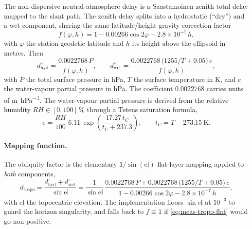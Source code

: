 The non-dispersive neutral-atmosphere delay is a Saastamoinen zenith total
delay \citep{saastamoinen1972} mapped to the slant path. The zenith delay
splits into a hydrostatic (``dry'') and a wet component, sharing the same
latitude/height gravity correction factor
\begin{equation}
  f(\varphi, h) = 1 - 0.00266\cos 2\varphi - 2.8\times 10^{-7}\,h ,
  \label{eq:meas-tropo-flat}
\end{equation}
with $\varphi$ the station geodetic latitude and $h$ its height above the
ellipsoid in metres. Then
\begin{equation}
  d^{z}_\mathrm{hyd} = \frac{0.0022768\,P}{f(\varphi,h)},
  \qquad
  d^{z}_\mathrm{wet}
    = \frac{0.0022768\,\big(1255/T + 0.05\big)\,e}{f(\varphi,h)},
  \label{eq:meas-tropo-zenith}
\end{equation}
with $P$ the total surface pressure in \si{\hecto\pascal}, $T$ the surface
temperature in \si{\kelvin}, and $e$ the water-vapour partial pressure in
\si{\hecto\pascal}. The coefficient $0.0022768$ carries units of
\si{\meter\per\hecto\pascal}. The water-vapour partial pressure is derived from
the relative humidity $RH \in [0,100]\,\%$ through a Tetens saturation formula,
\begin{equation}
  e = \frac{RH}{100}\;6.11\,
      \exp\!\left(\frac{17.27\,t_C}{t_C + 237.3}\right),
  \qquad t_C = T - \SI{273.15}{\kelvin} .
  \label{eq:meas-tropo-tetens}
\end{equation}

\paragraph{Mapping function.} The obliquity factor is the elementary
$1/\sin(\mathrm{el})$ flat-layer mapping applied to \emph{both} components,
\begin{equation}
  d_\mathrm{tropo}
  = \frac{d^{z}_\mathrm{hyd} + d^{z}_\mathrm{wet}}{\sin \mathrm{el}}
  = \frac{1}{\sin\mathrm{el}}\,
    \frac{0.0022768\,P + 0.0022768\,\big(1255/T + 0.05\big)\,e}
         {1 - 0.00266\cos 2\varphi - 2.8\times 10^{-7}\,h},
  \label{eq:meas-tropo}
\end{equation}
with $\mathrm{el}$ the topocentric elevation. The implementation floors
$\sin\mathrm{el}$ at $10^{-3}$ to guard the horizon singularity, and falls back
to $f \equiv 1$ if \cref{eq:meas-tropo-flat} would go non-positive.

